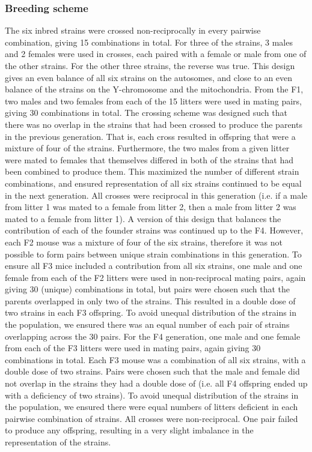 \begin{refsection}
\subsubsection{Breeding scheme}

The six inbred strains were crossed non-reciprocally in every pairwise combination, giving 15 combinations in total. For three of the strains, 3 males and 2 females were used in crosses, each paired with a female or male from one of the other strains. For the other three strains, the reverse was true. This design gives an even balance of all six strains on the autosomes, and close to an even balance of the strains on the Y-chromosome and the mitochondria.
From the F1, two males and two females from each of the 15 litters were used in mating pairs, giving 30 combinations in total. The crossing scheme was designed such that there was no overlap in the strains that had been crossed to produce the parents in the previous generation. That is, each cross resulted in offspring that were a mixture of four of the strains.  Furthermore, the two males from a given litter were mated to females that themselves differed in both of the strains that had been combined to produce them.  This maximized the number of different strain combinations, and ensured representation of all six strains continued to be equal in the next generation.  All crosses were reciprocal in this generation (i.e. if a male from litter 1 was mated to a female from litter 2, then a male from litter 2 was mated to a female from litter 1). 
A version of this design that balances the contribution of each of the founder strains was continued up to the F4. However, each F2 mouse was a mixture of four of the six strains, therefore it was not possible to form pairs between unique strain combinations in this generation.  
To ensure all F3 mice included a contribution from all six strains, one male and one female from each of the F2 litters were used in non-reciprocal mating pairs, again giving 30 (unique) combinations in total, but pairs were chosen such that the parents overlapped in only two of the strains. This resulted in a double dose of two strains in each F3 offspring. To avoid unequal distribution of the strains in the population, we ensured there was an equal number of each pair of strains overlapping across the 30 pairs. 
For the F4 generation, one male and one female from each of the F3 litters were used in mating pairs, again giving 30 combinations in total. Each F3 mouse was a combination of all six strains, with a double dose of two strains. Pairs were chosen such that the male and female did not overlap in the strains they had a double dose of (i.e. all F4 offspring ended up with a deficiency of two strains).  To avoid unequal distribution of the strains in the population, we ensured there were equal numbers of litters deficient in each pairwise combination of strains.  All crosses were non-reciprocal.  One pair failed to produce any offspring, resulting in a very slight imbalance in the representation of the strains. 

\end{refsection}
